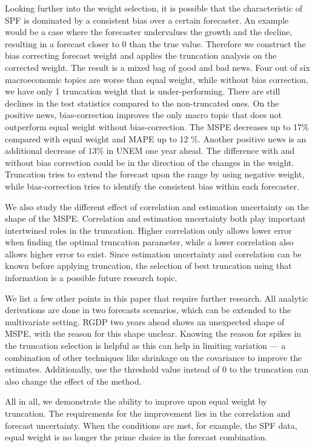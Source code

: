 \documentclass[11pt]{article}
\begin{document}
Looking further into the weight selection, it is possible that the characteristic of SPF is dominated by a consistent bias over a certain forecaster. An example would be a case where the forecaster undervalues the growth and the decline, resulting in a forecast closer to 0 than the true value. Therefore we construct the bias correcting forecast weight and applies the truncation analysis on the corrected weight. The result is a mixed bag of good and bad news. Four out of six macroeconomic topics are worse than equal weight, while without bias correction, we have only 1 truncation weight that is under-performing. There are still declines in the test statistics compared to the non-truncated ones. On the positive news, bias-correction improves the only macro topic that does not outperform equal weight without bias-correction. The MSPE decreases up to 17\% compared with equal weight and MAPE up to 12 \%. Another positive news is an additional decrease of 13\% in UNEM one year ahead. The difference with and without bias correction could be in the direction of the changes in the weight. Truncation tries to extend the forecast upon the range by using negative weight, while bias-correction tries to identify the consistent bias within each forecaster.

We also study the different effect of correlation and estimation uncertainty on the shape of the MSPE. Correlation and estimation uncertainty both play important intertwined roles in the truncation. Higher correlation only allows lower error when finding the optimal truncation parameter, while a lower correlation also allows higher error to exist. Since estimation uncertainty and correlation can be known before applying truncation, the selection of best truncation using that information is a possible future research topic.

We list a few other points in this paper that require further research. All analytic derivations are done in two forecasts scenarios, which can be extended to the multivariate setting. RGDP two years ahead shows an unexpected shape of MSPE, with the reason for this shape unclear. Knowing the reason for spikes in the truncation selection is helpful as this can help in limiting variation — a combination of other techniques like shrinkage on the covariance to improve the estimates. Additionally, use the threshold value instead of 0 to the truncation can also change the effect of the method.

All in all, we demonstrate the ability to improve upon equal weight by truncation. The requirements for the improvement lies in the correlation and forecast uncertainty. When the conditions are met, for example, the SPF data, equal weight is no longer the prime choice in the forecast combination. 

\newpage



\end{document}
